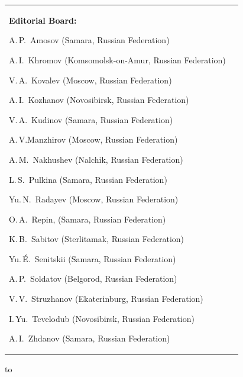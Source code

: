 \begin{table}[t!]
\begin{center}
\begin{tabular}{p{7cm}p{6cm}}
{\bigskip
\textbf{Editorial Board:}
\par \smallskip
A.\,P.~Amosov (Samara, Russian Federation) \par 
A.\,I.~Khromov (Komsomolsk-on-Amur, Russian Federation)\par
V.\,A.~Kovalev (Moscow, Russian Federation)\par
A.\,I.~Kozhanov (Novosibirsk, Russian Federation) \par 
V.\,A.~Kudinov (Samara, Russian Federation) \par 
A.\,V.Manzhirov (Moscow, Russian Federation)\par
A.\,M.~Nakhushev (Nalchik, Russian Federation)\par
L.\,S.~Pulkina (Samara, Russian Federation)\par
Yu.\,N.~Radayev  (Moscow, Russian Federation)\par 
O.\,A.~Repin, (Samara, Russian Federation) \par 
K.\,B.~Sabitov  (Sterlitamak, Russian Federation)\par
Yu.\,\'E.~Senitskii (Samara, Russian Federation)\par 
A.\,P.~Soldatov (Belgorod, Russian Federation)\par
V.\,V.~Struzhanov (Ekaterinburg, Russian Federation)\par 
I.\,Yu.~Tcvelodub (Novosibirsk, Russian Federation) \par
A.\,I.~Zhdanov (Samara, Russian Federation)  \par 

\smallskip



\bigskip 


}  \\
\end{tabular}

\hbox to 

\vspace{-1cm}

\end{center}
\end{table}


\clearpage



\normalfont


